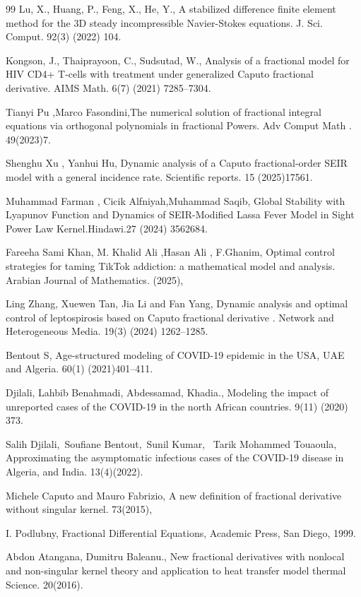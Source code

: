\documentclass[10pt]{NSP1}
\numberwithin{equation}{section}
\begin{document}
\begin{thebibliography}{99}
Lu, X., Huang, P., Feng, X., He, Y., A stabilized difference finite element method for the 3D steady incompressible Navier-Stokes equations. J. Sci. Comput. 92(3) (2022) 104.

Kongson, J., Thaiprayoon, C., Sudsutad, W., Analysis of a fractional model for HIV CD4+ T-cells with treatment under generalized Caputo fractional derivative. AIMS Math. 6(7) (2021) 7285–7304.

Tianyi Pu ,Marco Fasondini,The numerical solution of fractional integral equations via orthogonal polynomials in fractional Powers. Adv Comput Math . 49(2023)7.

Shenghu Xu , Yanhui Hu, Dynamic analysis of a Caputo fractional-order SEIR model with a general incidence rate. Scientific reports. 15 (2025)17561.

Muhammad Farman , Cicik Alfniyah,Muhammad Saqib, Global Stability with Lyapunov Function and Dynamics of SEIR-Modified Lassa Fever Model in Sight Power Law Kernel.Hindawi.27 (2024) 3562684.

Fareeha Sami Khan, M. Khalid Ali ,Hasan Ali , F.Ghanim, Optimal control strategies for taming TikTok addiction: a mathematical model and analysis. Arabian Journal of Mathematics. (2025),

Ling Zhang, Xuewen Tan, Jia Li and Fan Yang, Dynamic analysis and optimal control of leptospirosis based on Caputo fractional derivative . Network and Heterogeneous Media. 19(3) (2024) 1262–1285.

Bentout S, Age-structured modeling of COVID-19 epidemic in the USA, UAE and Algeria. 60(1) (2021)401–411.

Djilali, Lahbib Benahmadi, Abdessamad, Khadia., Modeling the impact of unreported cases of the COVID-19 in the north African countries. 9(11) (2020) 373.

Salih Djilali, Soufiane Bentout, Sunil Kumar,  Tarik Mohammed Touaoula, Approximating the asymptomatic infectious cases of the COVID-19 disease in Algeria, and India. 13(4)(2022).

Michele Caputo and Mauro Fabrizio, A new deﬁnition of fractional derivative without singular kernel. 73(2015),

I. Podlubny, Fractional Diﬀerential Equations, Academic Press, San Diego, 1999.

Abdon Atangana, Dumitru Baleanu., New fractional derivatives with nonlocal and non-singular kernel theory and application to heat transfer model thermal Science. 20(2016).


\end{thebibliography}
\end{document}
